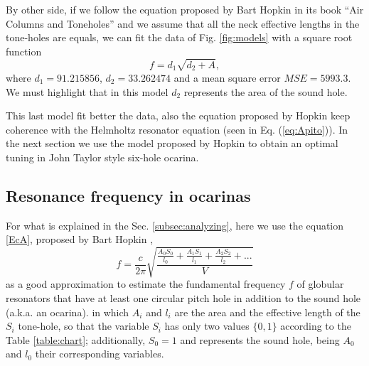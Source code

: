 \documentclass[11pt,twocolumn]{article}
\begin{document}
By other side, 
if we follow the equation proposed by Bart Hopkin in its book ``Air Columns and Toneholes'' 
\cite[pp. 44]{cabreraestudio} \cite[pp. 16]{1999air} and we assume that all the neck effective lengths in the tone-holes are equals,
we can fit the data of Fig. \ref{fig:models} with a square root function
\begin{equation}
f=d_1\sqrt{d_2+A},
\end{equation}
where $d_1=91.215856$, $d_2=33.262474$ and a mean square error $MSE=5993.3$.
We must highlight that in this model $d_2$ represents the area of the sound hole. 

This last model fit better the data, 
also the equation proposed by Hopkin keep coherence with the Helmholtz resonator equation (seen in Eq. (\ref{eq:Apito})).
In the next section we use the model proposed by Hopkin to obtain an optimal tuning in 
John Taylor style six-hole ocarina.


\subsection{Resonance frequency in ocarinas}
\label{subsec:Resonance}
For what is explained in the Sec. \ref{subsec:analyzing}, here 
we use the equation \ref{EcA}, proposed by Bart Hopkin \cite[pp. 44]{cabreraestudio} \cite[pp. 16]{1999air},
\begin{equation} \label{EcA}
 f = \frac{c}{2 \pi} \sqrt{\frac{\frac{A_{0}S_{0}}{l_{0}}+\frac{A_{1}S_{1}}{l_{1}}+\frac{A_{2}S_{2}}{l_{2}}+ . . .}{V} }   
\end{equation}
as a good approximation to estimate the fundamental frequency $f$ 
of globular resonators that have at least one circular pitch hole in addition to the sound hole (a.k.a. an ocarina). 
in which $A_i$ and $l_i$ are the area and the effective length of the $S_i$ tone-hole, 
so that the variable $S_i$ has only two values $\{0,1\}$ according to the Table \ref{table:chart}; 
additionally, $S_0=1$ and represents the sound hole, being $A_0$ and $l_0$ their corresponding variables. 
\end{document}
